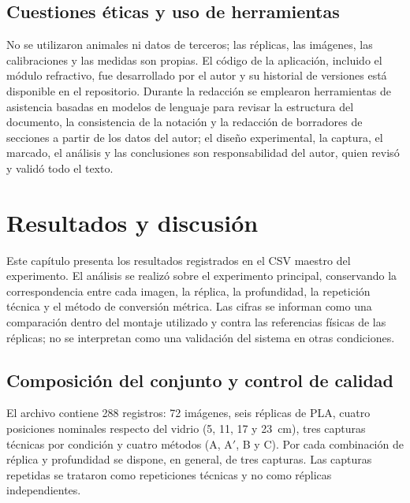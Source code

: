 \documentclass{report}
\newcommand{\Aprime}{A$'$}
\begin{document}
\section{Cuestiones éticas y uso de herramientas}
\label{sec:etica}

No se utilizaron animales ni datos de terceros; las réplicas, las imágenes, las calibraciones y las medidas son propias. El código de la aplicación, incluido el módulo refractivo, fue desarrollado por el autor y su historial de versiones está disponible en el repositorio. Durante la redacción se emplearon herramientas de asistencia basadas en modelos de lenguaje para revisar la estructura del documento, la consistencia de la notación y la redacción de borradores de secciones a partir de los datos del autor; el diseño experimental, la captura, el marcado, el análisis y las conclusiones son responsabilidad del autor, quien revisó y validó todo el texto.

\chapter{Resultados y discusión}
\label{cap:resultados}

Este capítulo presenta los resultados registrados en el CSV maestro del experimento. El análisis se realizó sobre el experimento principal, conservando la correspondencia entre cada imagen, la réplica, la profundidad, la repetición técnica y el método de conversión métrica. Las cifras se informan como una comparación dentro del montaje utilizado y contra las referencias físicas de las réplicas; no se interpretan como una validación del sistema en otras condiciones.

\section{Composición del conjunto y control de calidad}
\label{sec:conjunto}

El archivo contiene 288 registros: 72 imágenes, seis réplicas de PLA, cuatro posiciones nominales respecto del vidrio (5, 11, 17 y 23~cm), tres capturas técnicas por condición y cuatro métodos (A, \Aprime, B y C). Por cada combinación de réplica y profundidad se dispone, en general, de tres capturas. Las capturas repetidas se trataron como repeticiones técnicas y no como réplicas independientes.
\end{document}
